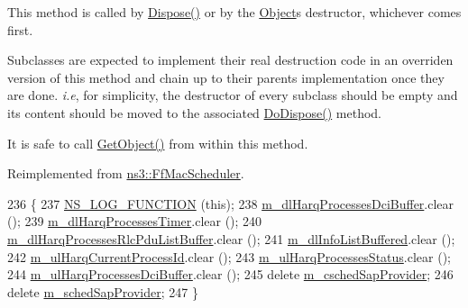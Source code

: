 This method is called by \hyperlink{classns3_1_1Object_aa90ae598863f6c251cdab3c3722afdaf}{Dispose()} or by the \hyperlink{classns3_1_1Object}{Object}\textquotesingle{}s destructor, whichever comes first.

Subclasses are expected to implement their real destruction code in an overriden version of this method and chain up to their parent\textquotesingle{}s implementation once they are done. {\itshape i.\+e}, for simplicity, the destructor of every subclass should be empty and its content should be moved to the associated \hyperlink{classns3_1_1RrFfMacScheduler_aced4936f3db961c26a06bb6ed6c4a7bb}{Do\+Dispose()} method.

It is safe to call \hyperlink{classns3_1_1Object_a13e18c00017096c8381eb651d5bd0783}{Get\+Object()} from within this method. 

Reimplemented from \hyperlink{classns3_1_1FfMacScheduler_a771411e455992b81d8399681779debd9}{ns3\+::\+Ff\+Mac\+Scheduler}.


\begin{DoxyCode}
236 \{
237   \hyperlink{log-macros-disabled_8h_a90b90d5bad1f39cb1b64923ea94c0761}{NS\_LOG\_FUNCTION} (\textcolor{keyword}{this});
238   \hyperlink{classns3_1_1RrFfMacScheduler_a6611390f9589d1df0b0f4c0932219eeb}{m\_dlHarqProcessesDciBuffer}.clear ();
239   \hyperlink{classns3_1_1RrFfMacScheduler_ab5040cff67dad6c8fdfc9c32c90916df}{m\_dlHarqProcessesTimer}.clear ();
240   \hyperlink{classns3_1_1RrFfMacScheduler_a2a6afd0a7df7a71c20382176f6cc9573}{m\_dlHarqProcessesRlcPduListBuffer}.clear ();
241   \hyperlink{classns3_1_1RrFfMacScheduler_a4176ffb0eba681a3e3b5be0be1a30771}{m\_dlInfoListBuffered}.clear ();
242   \hyperlink{classns3_1_1RrFfMacScheduler_ad7674f8cb560202bc36a792f7b2755ca}{m\_ulHarqCurrentProcessId}.clear ();
243   \hyperlink{classns3_1_1RrFfMacScheduler_a13fbe24878639869771e77ff813373ff}{m\_ulHarqProcessesStatus}.clear ();
244   \hyperlink{classns3_1_1RrFfMacScheduler_a530849c4c8d3d5b0796e6af3d8d95173}{m\_ulHarqProcessesDciBuffer}.clear ();
245   \textcolor{keyword}{delete} \hyperlink{classns3_1_1RrFfMacScheduler_ae6ce3afa91bf2a75735f5c6fd284edc4}{m\_cschedSapProvider};
246   \textcolor{keyword}{delete} \hyperlink{classns3_1_1RrFfMacScheduler_ab15e0bbc67a80549487697c081286bf3}{m\_schedSapProvider};
247 \}
\end{DoxyCode}
